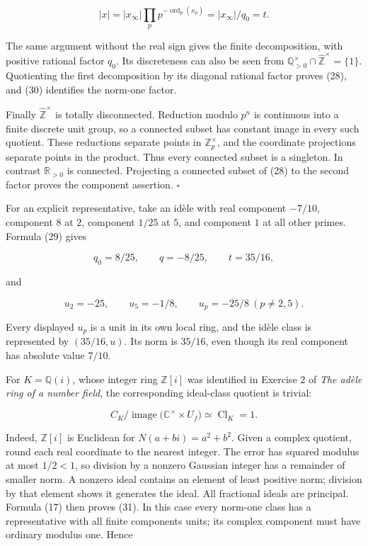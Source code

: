 \documentclass[
  english,
  11pt,
  a4paper,
]{article}
\begin{document}
\[|x|=|x_\infty|\prod_p p^{-\operatorname{ord}_p(x_p)}
=|x_\infty|/q_0=t.
\tag{30}\]

The same argument without the real sign gives the finite decomposition,
with positive rational factor \(q_0\). Its discreteness can also be seen
from \(\mathbb Q_{>0}^\times\cap\widehat{\mathbb Z}^{\times}=\{1\}\).
Quotienting the first decomposition by its diagonal rational factor
proves (28), and (30) identifies the norm-one factor.

Finally \(\widehat{\mathbb Z}^{\times}\) is totally disconnected.
Reduction modulo \(p^n\) is continuous into a finite discrete unit
group, so a connected subset has constant image in every such quotient.
These reductions separate points in \(\mathbb Z_p^\times\), and the
coordinate projections separate points in the product. Thus every
connected subset is a singleton. In contrast \(\mathbb R_{>0}\) is
connected. Projecting a connected subset of (28) to the second factor
proves the component assertion. \(\square\)

For an explicit representative, take an idèle with real component
\(-7/10\), component \(8\) at \(2\), component \(1/25\) at \(5\), and
component \(1\) at all other primes. Formula (29) gives

\[q_0=8/25,\qquad q=-8/25,\qquad t=35/16,\]

and

\[u_2=-25,\qquad u_5=-1/8,\qquad u_p=-25/8\ (p\ne2,5).\]

Every displayed \(u_p\) is a unit in its own local ring, and the idèle
class is represented by \((35/16,u)\). Its norm is \(35/16\), even
though its real component has absolute value \(7/10\).

For \(K=\mathbb Q(i)\), whose integer ring \(\mathbb Z[i]\) was
identified in Exercise 2 of \emph{The adèle ring of a number field}, the
corresponding ideal-class quotient is trivial:

\[C_K/\operatorname{image}\bigl(\mathbb C^\times\times U_f\bigr)
\simeq\operatorname{Cl}_K=1.
\tag{31}\]

Indeed, \(\mathbb Z[i]\) is Euclidean for \(N(a+bi)=a^2+b^2\). Given a
complex quotient, round each real coordinate to the nearest integer. The
error has squared modulus at most \(1/2<1\), so division by a nonzero
Gaussian integer has a remainder of smaller norm. A nonzero ideal
contains an element of least positive norm; division by that element
shows it generates the ideal. All fractional ideals are principal.
Formula (17) then proves (31). In this case every norm-one class has a
representative with all finite components units; its complex component
must have ordinary modulus one. Hence
\end{document}
